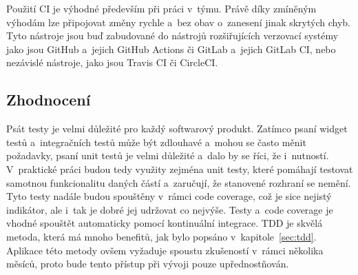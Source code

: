 Použití CI je výhodné především při práci v~týmu.
Právě díky zmíněným výhodám lze připojovat změny rychle a~bez obav o~zanesení
jinak skrytých chyb.
Tyto nástroje jsou buď zabudované do nástrojů rozšiřujících verzovací systémy
jako jsou GitHub a~jejich GitHub Actions či GitLab a~jejich GitLab CI,
nebo nezávislé nástroje,
jako jsou Travis CI či CircleCI.~\cite{ci}

\subsection{Zhodnocení}

Psát testy je velmi důležité pro každý softwarový produkt.
Zatímco psaní widget testů a~integračních testů může být zdlouhavé
a~mohou se často měnit požadavky,
psaní unit testů je velmi důležité a~dalo by se říci,
že i~nutností.
V~praktické práci budou tedy využity zejména unit testy,
které pomáhají testovat samotnou funkcionalitu daných částí
a~zaručují,
že stanovené rozhraní se nemění.
Tyto testy nadále budou spouštěny v~rámci code coverage,
což je sice nejistý indikátor,
ale i~tak je dobré jej udržovat co nejvýše.
Testy a~code coverage je vhodné spouštět automaticky pomocí kontinuální
integrace.
TDD je skvělá metoda,
která má mnoho benefitů,
jak bylo popsáno v~kapitole~\ref{sec:tdd}.
Aplikace této metody ovšem vyžaduje spoustu zkušeností
v~rámci několika měsíců,
proto bude tento přístup při vývoji pouze upřednostňován.

